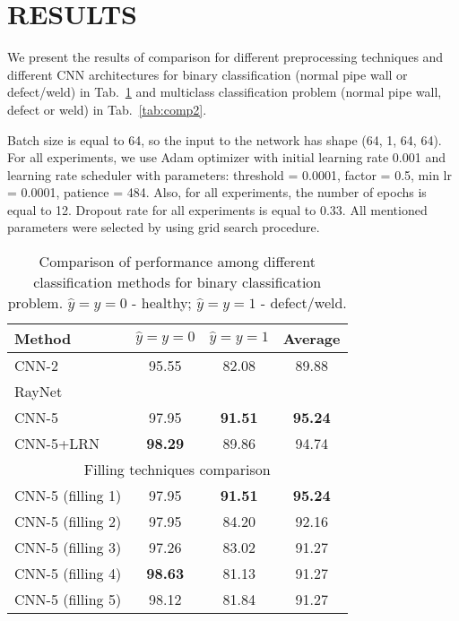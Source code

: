 \section{RESULTS}
\label{RESULTS}

We present the results of comparison for different preprocessing techniques and different CNN architectures for binary classification (normal pipe wall or defect/weld) in Tab.~\ref{tab:comp1} and multiclass classification problem (normal pipe wall, defect or weld) in Tab.~\ref{tab:comp2}.

Batch size is equal to 64, so the input to the network has shape (64, 1, 64, 64).
For all experiments, we use Adam optimizer with initial learning rate 0.001 and learning rate scheduler with parameters: threshold = 0.0001, factor = 0.5, min lr = 0.0001, patience = 484.
Also, for all experiments, the number of epochs is equal to 12.
Dropout rate for all experiments is equal to 0.33.
All mentioned parameters were selected by using grid search procedure.

\begin{table}[!htb]
	\caption{\label{tab:comp1}Comparison of performance among different classification methods for binary classification problem. $\hat{y}=y=0$ - healthy; $\hat{y}=y=1$ - defect/weld.}
	\begin{center}
		\small
		\begin{tabular}{| l | c | c | c |}
			\hline
			Method & $\hat{y}=y=0$ & $\hat{y}=y=1$ & Average \\
			\hline
			CNN-2 & 95.55 & 82.08 & 89.88 \\
			RayNet &  &  &  \\
			CNN-5 & 97.95 & \textbf{91.51} & \textbf{95.24} \\
			CNN-5+LRN & \textbf{98.29} & 89.86 & 94.74 \\
			\hline
			\multicolumn{4}{|c|}{Filling techniques comparison}  \\
			\hline
			CNN-5 (filling 1) & 97.95 & \textbf{91.51} & \textbf{95.24} \\
			CNN-5 (filling 2) & 97.95 & 84.20 & 92.16 \\
			CNN-5 (filling 3) & 97.26 & 83.02 & 91.27 \\
			CNN-5 (filling 4) & \textbf{98.63} & 81.13 & 91.27 \\
			CNN-5 (filling 5) & 98.12 & 81.84 & 91.27 \\
			\hline
		\end{tabular}
	\end{center}
\end{table}

